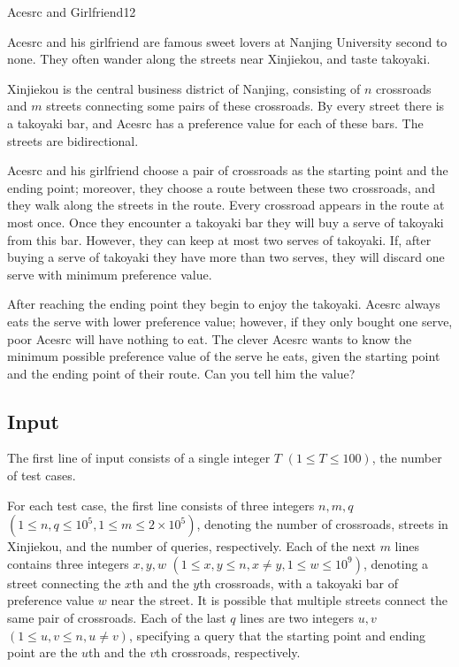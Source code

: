 \begin{Problem}{Acesrc and Girlfriend}{12}

Acesrc and his girlfriend are famous sweet lovers at Nanjing University second to none. They often wander along the streets near Xinjiekou, and taste takoyaki.

Xinjiekou is the central business district of Nanjing, consisting of $n$ crossroads and $m$ streets connecting some pairs of these crossroads. By every street there is a takoyaki bar, and Acesrc has a preference value for each of these bars. The streets are bidirectional.

Acesrc and his girlfriend choose a pair of crossroads as the starting point and the ending point; moreover, they choose a route between these two crossroads, and they walk along the streets in the route. Every crossroad appears in the route at most once. Once they encounter a takoyaki bar they will buy a serve of takoyaki from this bar. However, they can keep at most two serves of takoyaki. If, after buying a serve of takoyaki they have more than two serves, they will discard one serve with minimum preference value.

After reaching the ending point they begin to enjoy the takoyaki. Acesrc always eats the serve with lower preference value; however, if they only bought one serve, poor Acesrc will have nothing to eat. The clever Acesrc wants to know the minimum possible preference value of the serve he eats, given the starting point and the ending point of their route. Can you tell him the value?

\subsection*{Input}

The first line of input consists of a single integer $T$ $(1 \leq T \leq 100)$, the number of test cases. 

For each test case, the first line consists of three integers $n, m, q$ $(1 \leq n, q \leq 10^5, 1 \leq m \leq 2 \times 10^5)$, denoting the number of crossroads, streets in Xinjiekou, and the number of queries, respectively. Each of the next $m$ lines contains three integers $x, y, w$ $(1 \leq x, y \leq n, x \neq y, 1 \leq w \leq 10^9)$, denoting a street connecting the $x$th and the $y$th crossroads, with a takoyaki bar of preference value $w$ near the street. It is possible that multiple streets connect the same pair of crossroads. Each of the last $q$ lines are two integers $u, v$ $(1 \leq u, v \leq n, u \neq v)$, specifying a query that the starting point and ending point are the $u$th and the $v$th crossroads, respectively.


\end{Problem}
